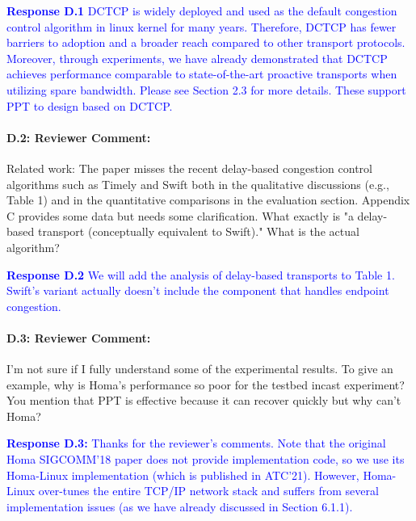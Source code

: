 \documentclass[12pt,one-column]{article}
\begin{document}
\noindent\textcolor{blue}{\textbf{Response D.1}
DCTCP is widely deployed and used as the default congestion control algorithm in linux kernel for many years.
Therefore, DCTCP has fewer barriers to adoption and a broader reach compared to other transport protocols.
Moreover, through experiments, we have already demonstrated that DCTCP achieves performance comparable to state-of-the-art proactive transports when utilizing spare bandwidth.
Please see Section 2.3 for more details.
These support PPT to design based on DCTCP.
} 

{\it \paragraph{D.2: Reviewer Comment:}Related work: The paper misses the recent delay-based congestion control algorithms such as Timely and Swift both in the qualitative discussions (e.g., Table 1) and in the quantitative comparisons in the evaluation section. Appendix C provides some data but needs some clarification. What exactly is "a delay-based transport (conceptually equivalent to Swift)." What is the actual algorithm?}

\noindent\textcolor{blue}{\textbf{Response D.2}
We will add the analysis of delay-based transports to Table 1.
Swift's variant actually doesn't include the component that handles endpoint congestion.
} 


{\it \paragraph{D.3: Reviewer Comment:} I'm not sure if I fully understand some of the experimental results. To give an example, why is Homa's performance so poor for the testbed incast experiment? You mention that PPT is effective because it can recover quickly but why can't Homa?}


\noindent\textcolor{blue}{\textbf{Response D.3:}
Thanks for the reviewer's comments.
Note that the original Homa SIGCOMM'18 paper does not provide implementation code, so we use its Homa-Linux implementation (which is published in ATC'21).
However, Homa-Linux over-tunes the entire TCP/IP network stack and suffers from several implementation issues (as we have already discussed in Section 6.1.1).
}
\end{document}
